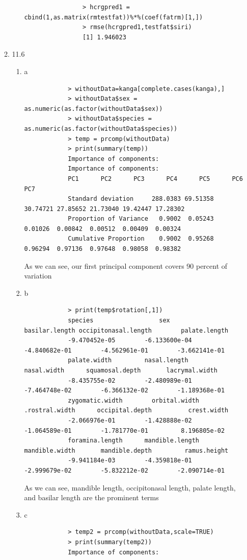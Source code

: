 \documentclass[11pt]{article}
\begin{document}
\begin{enumerate}
\begin{enumerate}
\begin{enumerate}
			\begin{verbatim}
				> hcrgpred1 = cbind(1,as.matrix(rmtestfat))%*%(coef(fatrm)[1,])
				> rmse(hcrgpred1,testfat$siri)
				[1] 1.946023
			\end{verbatim}
	\end{enumerate}
	\item 11.6
	\begin{enumerate}
		\item a
		\begin{verbatim}
			> withoutData=kanga[complete.cases(kanga),]
			> withoutData$sex = as.numeric(as.factor(withoutData$sex))
			> withoutData$species = as.numeric(as.factor(withoutData$species))
			> temp = prcomp(withoutData)
			> print(summary(temp))
			Importance of components:
			Importance of components:
			PC1      PC2      PC3      PC4      PC5      PC6      PC7     
			Standard deviation     288.0383 69.51358 30.74721 27.85652 21.73040 19.42447 17.28302 
			Proportion of Variance   0.9002  0.05243  0.01026  0.00842  0.00512  0.00409  0.00324  
			Cumulative Proportion    0.9002  0.95268  0.96294  0.97136  0.97648  0.98058  0.98382  
		\end{verbatim}
		As we can see, our first principal component covers 90 percent of variation
		\item b
		\begin{verbatim}
			> print(temp$rotation[,1])
			species                  sex       basilar.length occipitonasal.length        palate.length 
			-9.470452e-05        -6.133600e-04        -4.840682e-01        -4.562961e-01        -3.662141e-01 
			palate.width         nasal.length          nasal.width      squamosal.depth       lacrymal.width 
			-8.435755e-02        -2.480989e-01        -7.464748e-02        -6.366132e-02        -1.189368e-01 
			zygomatic.width        orbital.width       .rostral.width      occipital.depth          crest.width 
			-2.066976e-01        -1.428888e-02        -1.064589e-01        -1.781770e-01         8.196805e-02 
			foramina.length      mandible.length       mandible.width       mandible.depth         ramus.height 
			-9.941184e-03        -4.359818e-01        -2.999679e-02        -5.832212e-02        -2.090714e-01 
		\end{verbatim}
		As we can see, mandible length, occipitonasal length, palate length, and basilar length are the prominent terms
		\item c
		\begin{verbatim}
			> temp2 = prcomp(withoutData,scale=TRUE)
			> print(summary(temp2))
			Importance of components:

\end{verbatim}
\end{enumerate}
\end{enumerate}
\end{enumerate}
\end{document}

